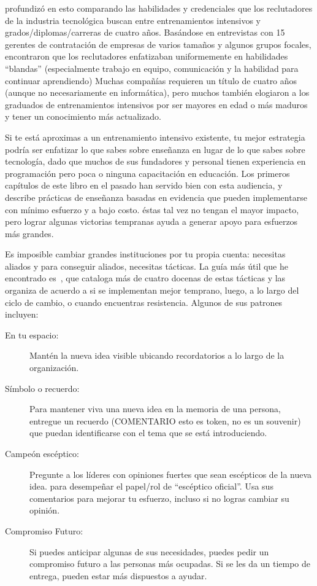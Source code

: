 \cite{Burk2018} profundizó en esto
comparando las habilidades y credenciales que los reclutadores de la industria tecnológica buscan 
entre  entrenamientos intensivos y grados/diplomas/carreras de cuatro años.
Basándose en entrevistas con 15 gerentes de contratación de empresas de varios tamaños y algunos grupos focales,
encontraron que los reclutadores enfatizaban uniformemente en habilidades ``blandas''
(especialmente trabajo en equipo, comunicación y la habilidad para continuar aprendiendo)
Muchas compañías requieren un título de cuatro años
(aunque no necesariamente en informática),
pero muchos también elogiaron a los graduados de  entrenamientos intensivos por ser mayores en edad o más maduros
y tener un conocimiento más actualizado.


Si te está aproximas a un  entrenamiento intensivo existente,
tu mejor estrategia podría ser enfatizar lo que sabes sobre enseñanza
en lugar de lo que sabes sobre tecnología,
dado que muchos de sus fundadores y personal tienen experiencia en programación
pero poca o ninguna capacitación en educación.
Los primeros capítulos de este libro en el pasado han servido bien con esta audiencia,
y ~\cite{Lang2016} describe
prácticas de enseñanza basadas en evidencia que pueden implementarse
con mínimo esfuerzo y a bajo costo.
éstas tal vez no tengan el mayor impacto, 
pero lograr algunas victorias tempranas ayuda a generar apoyo para esfuerzos más grandes.



Es imposible cambiar grandes instituciones por tu propia cuenta:
necesitas aliados
y para conseguir aliados,
necesitas tácticas.
La guía más útil que he encontrado es~\cite{Mann2015}, 
que cataloga más de cuatro docenas de estas tácticas
y las organiza de acuerdo a si se implementan mejor temprano,
luego,
a lo largo del ciclo de cambio,
o cuando encuentras resistencia.
Algunos de sus patrones incluyen:

\begin{description}

\item[En tu espacio:]
Mantén la nueva idea visible
ubicando recordatorios a lo largo de la organización.

\item[Símbolo o recuerdo:] 
Para mantener viva una nueva idea en la memoria de una persona,
entregue un recuerdo (COMENTARIO esto es token, no es un souvenir)   que puedan identificarse con el tema que se está introduciendo.

\item[Campeón escéptico:]
Pregunte a los líderes con opiniones  fuertes que sean escépticos de la nueva idea.
para desempeñar el papel/rol de ``escéptico oficial''.
Usa sus comentarios para mejorar tu esfuerzo,
incluso si no logras cambiar su opinión.


\item[Compromiso Futuro:]
 
 Si puedes anticipar algunas de sus necesidades,
puedes pedir un compromiso futuro a las personas más ocupadas.
Si se les da un tiempo de entrega,
pueden estar más dispuestos a ayudar.

  
\end{description}

